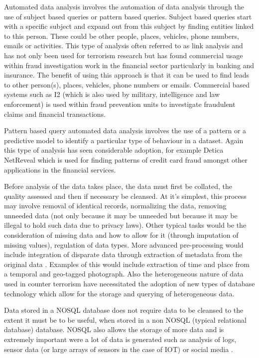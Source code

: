 Automated data analysis involves the automation of data analysis through the use of subject based queries or pattern based queries. Subject based queries start with a specific subject and expand out from this subject by finding entities linked to this person. These could be other people, places, vehicles, phone numbers, emails or activities. This type of analysis often referred to as link analysis \citep{berry1997data} and has not only been used for terrorism research but has found commercial usage within fraud investigation work in the financial sector particularly in banking and insurance. The benefit of using this approach is that it can be used to find leads to other person(s), places, vehicles, phone numbers or emails. Commercial based systems such as I2 \citep{i2Analyze2016} (which is also used by military, intelligence and law enforcement) is used within fraud prevention units to investigate fraudulent claims and financial transactions.

Pattern based query automated data analysis involves the use of a pattern or a predictive model to identify a particular type of behaviour in a dataset. Again this type of analysis has seen considerable adoption, for example Detica NetReveal \citep{oatley2011data} which is used for finding patterns of credit card fraud amongst other applications in the financial services.  

Before analysis of the data takes place, the data must first be collated, the quality assessed and then if necessary be cleansed. At it's simplest, this process may involve removal of identical records, normalizing the data, removing unneeded data (not only because it may be unneeded but because it may be illegal to hold such data due to privacy laws). Other typical tasks would be the consideration of missing data and how to allow for it (through imputation of missing values), regulation of data types. More advanced pre-processing would include integration of disparate data through extraction of metadata from the original data \citep{derosa2004data}. Examples of this would include extraction of  time and place from a temporal and geo-tagged photograph. Also the heterogeneous nature of data used in counter terrorism have necessitated the adoption of new types of database technology which allow for the storage and querying of heterogeneous data.  

Data stored in a NOSQL database does not require data to be cleansed to the extent it must be to be useful, when stored in a non NOSQL (typical relational database) database. NOSQL also allows the storage of more data and is extremely important were a lot of data is generated such as analysis of logs, sensor data (or large arrays of sensors in the case of IOT) or social media \citep{jeberson2015survey}.

